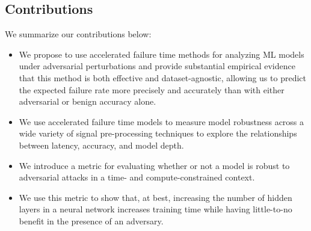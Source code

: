 

\subsection{Contributions}

We summarize our contributions below:
\begin{itemize}
    \item We propose to use accelerated failure time methods for analyzing ML models under adversarial perturbations and provide substantial empirical evidence that this method is both effective and dataset-agnostic, allowing us to predict the expected failure rate more precisely and accurately than with either adversarial or benign accuracy alone.
    \item We use accelerated failure time models to measure model robustness across a wide variety of signal pre-processing techniques to explore the relationships between latency, accuracy, and model depth.
    \item We introduce a metric for evaluating whether or not a model is robust to adversarial attacks in a time- and compute-constrained context.
    \item We use this metric to show that, at best, increasing the number of hidden layers in a neural network increases training time while having little-to-no benefit in the presence of an adversary.
\end{itemize}
